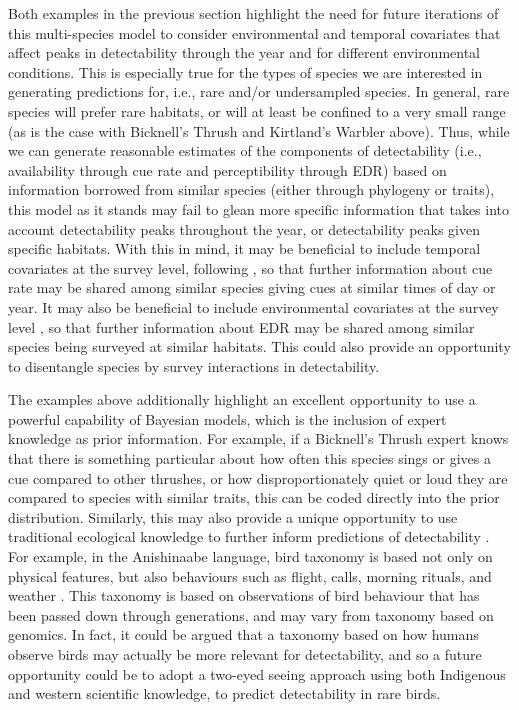 Both examples in the previous section highlight the need for future iterations of this multi-species model to consider environmental and temporal covariates that affect peaks in detectability through the year and for different environmental conditions. 
This is especially true for the types of species we are interested in generating predictions for, i.e., rare and/or undersampled species.
In general, rare species will prefer rare habitats, or will at least be confined to a very small range (as is the case with Bicknell’s Thrush and Kirtland’s Warbler above). 
Thus, while we can generate reasonable estimates of the components of detectability (i.e., availability through cue rate and perceptibility through EDR) based on information borrowed from similar species (either through phylogeny or traits), this model as it stands may fail to glean more specific information that takes into account detectability peaks throughout the year, or detectability peaks given specific habitats. 
With this in mind, it may be beneficial to include temporal covariates at the survey level, following \citet{solymos_calibrating_2013, solymos_evaluating_2018, edwards_point_2023}, so that further information about cue rate may be shared among similar species giving cues at similar times of day or year.
It may also be beneficial to include environmental covariates at the survey level \citep{solymos_calibrating_2013, edwards_point_2023}, so that further information about EDR may be shared among similar species being surveyed at similar habitats.
This could also provide an opportunity to disentangle species by survey interactions in detectability.

\par The examples above additionally highlight an excellent opportunity to use a powerful capability of Bayesian models, which is the inclusion of expert knowledge as prior information. 
For example, if a Bicknell’s Thrush expert knows that there is something particular about how often this species sings or gives a cue compared to other thrushes, or how disproportionately quiet or loud they are compared to species with similar traits, this can be coded directly into the prior distribution.
Similarly, this may also provide a unique opportunity to use traditional ecological knowledge to further inform predictions of detectability \citep{wardfear_sharper_2019}.
For example, in the Anishinaabe language, bird taxonomy is based not only on physical features, but also behaviours such as flight, calls, morning rituals, and weather \citep{pitawanakwat_evening_2022}.
This taxonomy is based on observations of bird behaviour that has been passed down through generations, and may vary from taxonomy based on genomics.
In fact, it could be argued that a taxonomy based on how humans observe birds may actually be more relevant for detectability, and so a future opportunity could be to adopt a two-eyed seeing approach \cite{reid_twoeyed_2021} using both Indigenous and western scientific knowledge, to predict detectability in rare birds.

